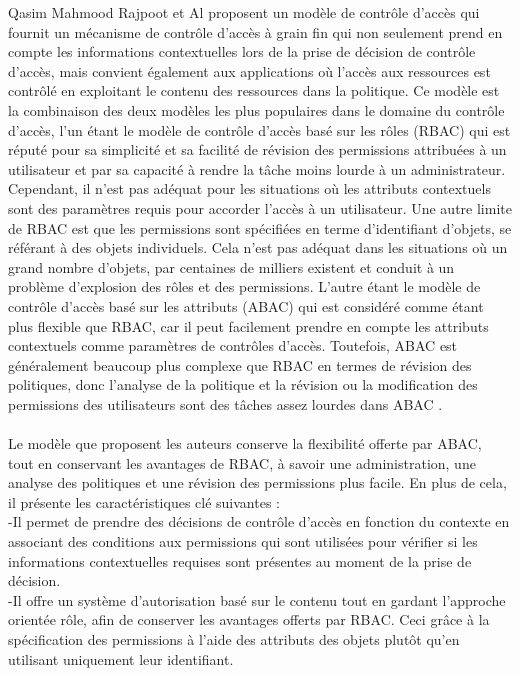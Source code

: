 Qasim Mahmood Rajpoot et Al \cite{rajpoot15}  proposent un modèle de contrôle d'accès qui fournit un mécanisme de contrôle d'accès à grain fin qui non seulement prend en compte les informations contextuelles lors de la prise de décision de contrôle d'accès, mais convient également aux applications où l'accès aux ressources est contrôlé en exploitant le contenu des ressources dans la politique. Ce modèle est la combinaison des deux modèles les plus populaires dans le domaine du contrôle d'accès, l'un étant le modèle de contrôle d'accès basé sur les rôles (RBAC) qui est réputé pour sa simplicité et sa facilité de révision des permissions attribuées à un utilisateur et par sa capacité à rendre la tâche moins lourde à un administrateur. Cependant, il n'est pas adéquat pour les situations où les attributs contextuels sont des paramètres requis pour accorder l'accès à un utilisateur. Une autre limite de RBAC est que les permissions sont spécifiées en terme d'identifiant d'objets, se référant à des objets individuels. Cela n'est pas adéquat dans les situations où un grand nombre d'objets, par centaines de milliers existent et conduit à un problème d'explosion des rôles et des permissions. L'autre étant le modèle de contrôle d'accès basé sur les attributs (ABAC) qui est considéré comme étant plus flexible que RBAC, car il peut facilement prendre en compte les attributs contextuels comme paramètres de contrôles d'accès. Toutefois, ABAC est généralement beaucoup plus complexe que RBAC en termes de révision des politiques, donc l'analyse de la politique et la révision ou la modification des permissions des utilisateurs sont des tâches assez lourdes dans ABAC \cite{rajpoot15}.
\paragraph{} Le modèle que proposent les auteurs conserve la flexibilité offerte par ABAC, tout en conservant les avantages de RBAC, à savoir une administration, une analyse des politiques et une révision des permissions plus facile. En plus de cela, il présente les caractéristiques clé suivantes \cite{rajpoot15} :\\
	-Il permet de prendre des décisions de contrôle d'accès en fonction du contexte en associant des conditions aux permissions qui sont utilisées pour vérifier si les informations contextuelles requises sont présentes au moment de la prise de décision.\\
	-Il offre un système d'autorisation basé sur le contenu tout en gardant l'approche orientée rôle, afin de conserver les avantages offerts par RBAC. Ceci grâce à la spécification des permissions à l'aide des attributs des objets plutôt qu'en utilisant uniquement leur identifiant.


